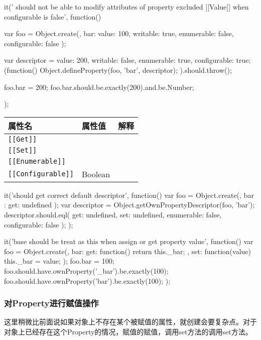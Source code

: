 \begin{JavaScript}
		it(' should not be able to modify attributes of property excluded [[Value]] when configurable is false', function(){
			var foo = Object.create({}, {
				bar: {value: 100, writable: true, enumerable: false, configurable: false}
			});

			var descriptor = {value: 200, writable: false, enumerable: true, configurable: true};
			(function(){
				Object.defineProperty(foo, 'bar', descriptor);
			}).should.throw();

			foo.bar = 200;
			foo.bar.should.be.exactly(200).and.be.Number;			
		});
\end{JavaScript}

\begin{tabular}{|l|l|l|}
\hline
属性名 & 属性值 & 解释 \\
\hline
\lstinline![[Get]]! & & \\
\hline
\lstinline![[Set]]! & & \\
\hline
\lstinline![[Enumerable]]! & & \\
\hline
\lstinline![[Configurable]]! & Boolean & \\
\hline
\end{tabular}

\begin{JavaScript}
		it('should get correct default descriptor', function(){
			var foo = Object.create({}, {
				bar : {get: undefined}
			});
			var descriptor = Object.getOwnPropertyDescriptor(foo, 'bar');
			descriptor.should.eql({
				get: undefined,
				set: undefined,
				enumerable: false,
				configurable: false
			});
		});
\end{JavaScript}

\begin{JavaScript}
		it('base should be treat as this when assign or get property value', function(){
			var foo = Object.create({}, {
				bar: {get: function(){
					return this._bar;
				}, 
				set: function(value){
					this._bar = value;
				}}
			});
			foo.bar = 100;
			foo.should.have.ownProperty('_bar').be.exactly(100);
			foo.should.have.ownProperty('bar').be.exactly(100);
		});
\end{JavaScript}

\subsubsection{对Property进行赋值操作}
这里稍微比前面说如果对象上不存在某个被赋值的属性，就创建会要复杂点。对于对象上已经存在这个Property的情况，赋值的赋值，调用set方法的调用set方法。

